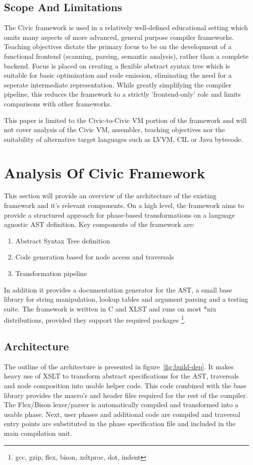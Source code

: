 \documentclass[twoside,openright]{uva-bachelor-thesis}
\begin{document}
	\section{Scope And Limitations}
		The Civic framework is used in a relatively well-defined educational setting which omits many aspects of more advanced, general purpose compiler frameworks. Teaching objectives dictate the primary focus to be on the development of a functional frontend (scanning, parsing, semantic analysis), rather than a complete backend. Focus is placed on creating a flexible abstract syntax tree which is suitable for basic optimization and code emission, eliminating the need for a seperate intermediate representation. While greatly simplifying the compiler pipeline, this reduces the framework to a strictly 'frontend-only' role and limits comparisons with other frameworks.
		
		This paper is limited to the Civic-to-Civic VM portion of the framework and will not cover analysis of the Civic VM, assembler, teaching objectives nor the suitability of alternative target languages such as LVVM, CIL or Java bytecode.


\chapter{Analysis Of Civic Framework}
	This section will provide an overview of the architecture of the existing framework and it's relevant components. On a high level, the framework aims to provide a structured approach for phase-based transformations on a language agnostic AST definition. Key components of the framework are:
	\begin{enumerate}
		\item Abstract Syntax Tree definition
		\item Code generation based for node access and traversals
		\item Transformation pipeline
	\end{enumerate}
	
	In addition it provides a documentation generator for the AST, a small base library for string manipulation, lookup tables and argument parsing and a testing suite. The framework is written in C and XLST and runs on most *nix distributions, provided they support the required packages \footnote{gcc, gzip, flex, bison, xsltproc, dot, indent}.
	
	\section{Architecture}
		The outline of the architecture is presented in figure~\ref{fig:build-dep}. It makes heavy use of XSLT to transform abstract specifications for the AST, traversals and node composition into usable helper code. This code combined with the base library provides the macro's and header files required for the rest of the compiler. The Flex/Bison lexer/parser is automatically compiled and transformed into a usable phase. Next, user phases and additional code are compiled and traversal entry points are substituted in the phase specification file and included in the main compilation unit.
		
\end{document}
